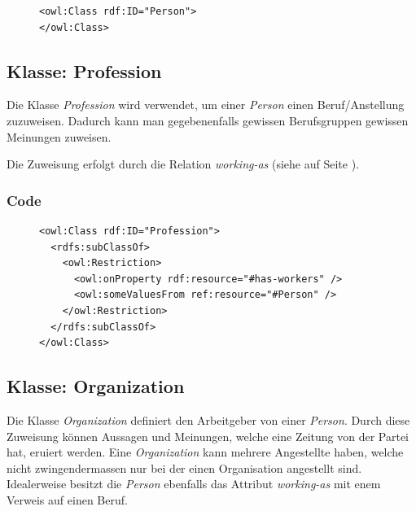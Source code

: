 \documentclass[
    11pt,
    latin1,
    a4paper,
    oneside
]{scrreprt}
\begin{document}
\begin{figure}[H]
 \lstset{language=XML}
 \begin{lstlisting}[label=owl:person,caption={Die Klasse \emph{Person} definiert alle Personen}]
<owl:Class rdf:ID="Person">
</owl:Class>
 \end{lstlisting}
\end{figure}


\subsection{Klasse: Profession} \label{sec:class_profession}

Die Klasse \emph{Profession} wird verwendet, um einer \emph{Person} einen Beruf/Anstellung zuzuweisen. Dadurch kann man gegebenenfalls gewissen Berufsgruppen gewissen Meinungen zuweisen.

Die Zuweisung erfolgt durch die Relation \emph{working-as} (siehe  auf Seite \pageref{sec:rel_workingas}).

\subsubsection{Code} \label{sec:class_profession_code}

\begin{figure}[H]
 \lstset{language=XML}
 \begin{lstlisting}[label=owl:profession,caption={Die Klasse \emph{Caption} beschreibt jegliche Berufe}]
<owl:Class rdf:ID="Profession">
  <rdfs:subClassOf>
    <owl:Restriction>
      <owl:onProperty rdf:resource="#has-workers" />
      <owl:someValuesFrom ref:resource="#Person" />
    </owl:Restriction>
  </rdfs:subClassOf>
</owl:Class>
 \end{lstlisting}
\end{figure}


\subsection{Klasse: Organization} \label{sec:class_organization}

Die Klasse \emph{Organization} definiert den Arbeitgeber von einer \emph{Person}. Durch diese Zuweisung k\"onnen Aussagen und Meinungen, welche eine Zeitung von der Partei hat, eruiert werden. Eine \emph{Organization} kann mehrere Angestellte haben, welche nicht zwingendermassen nur bei der einen Organisation angestellt sind. Idealerweise besitzt die \emph{Person} ebenfalls das Attribut \emph{working-as} mit enem Verweis auf einen Beruf.
\end{document}

